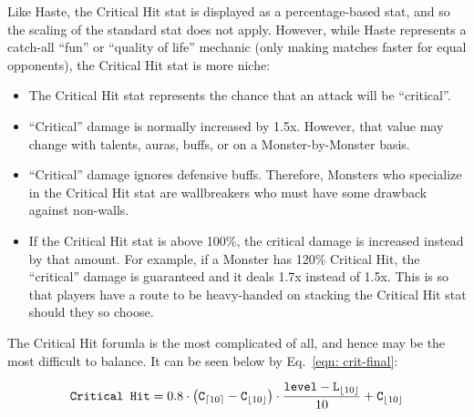 







Like Haste, the Critical Hit stat is displayed as a percentage-based stat, and so the scaling of the standard stat does not apply. However, while Haste represents a catch-all ``fun'' or ``quality of life'' mechanic (only making matches faster for equal opponents), the Critical Hit stat is more niche:

\begin{itemize}
	\item{The Critical Hit stat represents the chance that an attack will be ``critical''.}
	\item{``Critical'' damage is normally increased by 1.5x. However, that value may change with talents, auras, buffs, or on a Monster-by-Monster basis.}
	\item{``Critical'' damage ignores defensive buffs. Therefore, Monsters who specialize in the Critical Hit stat are wallbreakers who must have some drawback against non-walls.}
	\item{If the Critical Hit stat is above 100\%, the critical damage is increased instead by that amount. For example, if a Monster has 120\% Critical Hit, the ``critical'' damage is guaranteed and it deals 1.7x instead of 1.5x. This is so that players have a route to be heavy-handed on stacking the Critical Hit stat should they so choose.}
\end{itemize}

The Critical Hit forumla is the most complicated of all, and hence may be the most difficult to balance. It can be seen below by Eq.~\eqref{eqn: crit-final}:

\begin{equation}\label{eqn: crit-final}
\texttt{Critical Hit} =  
		0.8 \cdot 
		\left(\texttt{C}_{\lceil10\rceil} - \texttt{C}_{\lfloor10\rfloor}\right) \cdot
		\frac{\texttt{level} - \texttt{L}_{\lfloor10\rfloor}}{10} +
		\texttt{C}_{\lfloor10\rfloor}
\end{equation}

